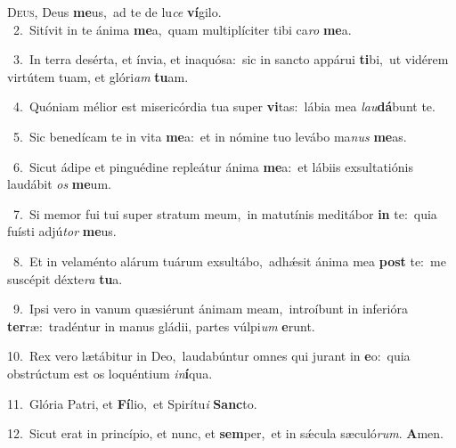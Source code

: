 \lettrine{\initial\textcolor{\initialcolor}{D}}{eus,} Deus \textbf{me}\-us,~\star ad te de lu\textit{ce} \textbf{ví}\-gilo.\\
{\numbfont\textcolor{\numbcolor}{~2.}}~Sitívit in te ánima \textbf{me}\-a,~\star quam multiplíciter tibi ca\textit{ro} \textbf{me}\-a.\par
{\numbfont\textcolor{\numbcolor}{~3.}}~In terra desérta, et ínvia, et inaquósa:~\dagger sic in sancto appárui \textbf{ti}\-bi,~\star ut vidérem virtútem tuam, et glóri\textit{am} \textbf{tu}\-am.\par
{\numbfont\textcolor{\numbcolor}{~4.}}~Quóniam mélior est misericórdia tua super \textbf{vi}\-tas:~\star lábia mea \textit{lau}\-\textbf{dá}bunt te.\par
{\numbfont\textcolor{\numbcolor}{~5.}}~Sic benedícam te in vita \textbf{me}\-a:~\star et in nómine tuo levábo ma\textit{nus} \textbf{me}\-as.\par
{\numbfont\textcolor{\numbcolor}{~6.}}~Sicut ádipe et pinguédine repleátur ánima \textbf{me}\-a:~\star et lábiis exsultatiónis laudábit \textit{os} \textbf{me}\-um.\par
{\numbfont\textcolor{\numbcolor}{~7.}}~Si memor fui tui super stratum meum,~\dagger in matutínis meditábor \textbf{in} te:~\star quia fuísti adjú\textit{tor} \textbf{me}\-us.\par
{\numbfont\textcolor{\numbcolor}{~8.}}~Et in velaménto alárum tuárum exsultábo,~\dagger adhǽsit ánima mea \textbf{post} te:~\star me suscépit déxte\textit{ra} \textbf{tu}\-a.\par
{\numbfont\textcolor{\numbcolor}{~9.}}~Ipsi vero in vanum quæsiérunt ánimam meam,~\dagger introíbunt in inferióra \textbf{ter}\-ræ:~\star tradéntur in manus gládii, partes vúlpi\textit{um} \textbf{e}\-runt.\par
{\numbfont\textcolor{\numbcolor}{10.}}~Rex vero lætábitur in Deo,~\dagger laudabúntur omnes qui jurant in \textbf{e}\-o:~\star quia obstrúctum est os loquéntium \textit{in}\-\textbf{í}qua.\par
{\numbfont\textcolor{\numbcolor}{11.}}~Glória Patri, et \textbf{Fí}\-lio,~\star et Spirítu\textit{i} \textbf{Sanc}\-to.\par
{\numbfont\textcolor{\numbcolor}{12.}}~Sicut erat in princípio, et nunc, et \textbf{sem}\-per,~\star et in sǽcula sæculó\-\textit{rum}\-. \textbf{A}\-men.\par
